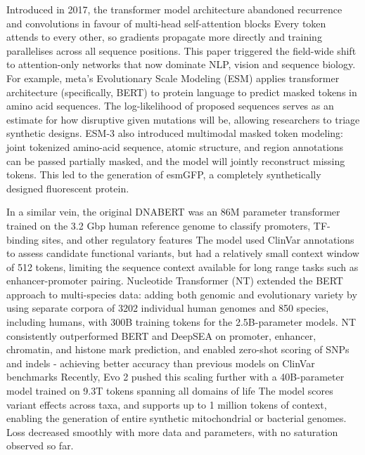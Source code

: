 Introduced in 2017, the transformer model architecture abandoned recurrence and convolutions in favour of multi-head self-attention blocks Every token attends to every other, so gradients propagate more directly and training parallelises across all sequence positions. This paper triggered the field-wide shift to attention-only networks that now dominate NLP, vision and sequence biology. For example, meta's Evolutionary Scale Modeling (ESM) applies transformer architecture (specifically, BERT) to protein language to predict masked tokens in amino acid sequences. The log-likelihood of proposed sequences serves as an estimate for how disruptive given mutations will be, allowing researchers to triage synthetic designs. ESM-3 also introduced multimodal masked token modeling: joint tokenized amino-acid sequence, atomic structure, and region annotations can be passed partially masked, and the model will jointly reconstruct missing tokens. This led to the generation of esmGFP, a completely synthetically designed fluorescent protein.

In a similar vein, the original DNABERT was an 86M parameter transformer trained on the 3.2 Gbp human reference genome to classify promoters, TF-binding sites, and other regulatory features The model used ClinVar annotations to assess candidate functional variants, but had a relatively small context window of 512 tokens, limiting the sequence context available for long range tasks such as enhancer-promoter pairing. Nucleotide Transformer (NT) extended the BERT approach to multi-species data: adding both genomic and evolutionary variety by using separate corpora of \num{3202} individual human genomes and 850 species, including humans, with 300B training tokens for the 2.5B-parameter models. NT consistently outperformed BERT and DeepSEA on promoter, enhancer, chromatin, and histone mark prediction, and enabled zero-shot scoring of SNPs and indels - achieving better accuracy than previous models on ClinVar benchmarks Recently, Evo 2 pushed this scaling further with a 40B-parameter model trained on 9.3T tokens spanning all domains of life The model scores variant effects across taxa, and supports up to 1 million tokens of context, enabling the generation of entire synthetic mitochondrial or bacterial genomes. Loss decreased smoothly with more data and parameters, with no saturation observed so far.

